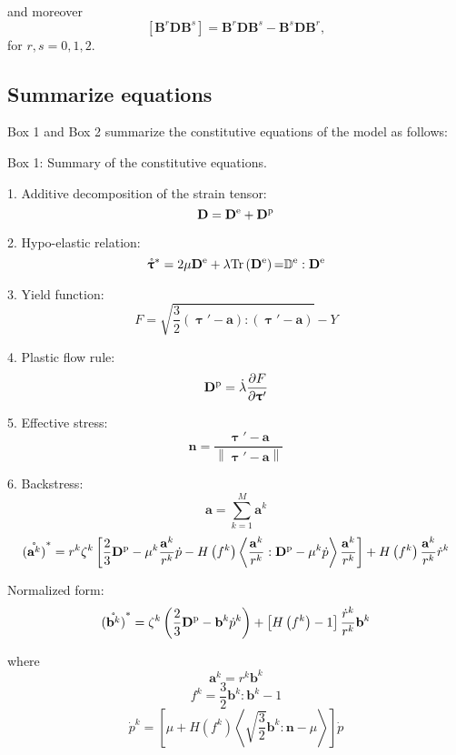 and moreover
\begin{equation}
\left[ {{{\mathbf{B}}^r}{\mathbf{D}}{{\mathbf{B}}^s}} \right] = {{\mathbf{B}}^r}{\mathbf{D}}{{\mathbf{B}}^s} - {{\mathbf{B}}^s}{\mathbf{D}}{{\mathbf{B}}^r},
\end{equation}
for $r,s = 0,1,2$.

\subsection{Summarize equations}
\noindent
Box 1 and Box 2 summarize the constitutive equations of the model as follows:
\begin{framed}
\label{Box:1}
Box 1: Summary of the constitutive equations.

1. Additive decomposition of the strain tensor:
\[{\mathbf{D}} = {{\mathbf{D}}^{\rm{e}}} + {{\mathbf{D}}^{\rm{p}}}\]

2. Hypo-elastic relation:
\[{\mathring {\bm{\uptau }}^{*}} = 2\mu {{\mathbf{D}}^{\rm{e}}} + \lambda {\rm{Tr}}\left( {{{\mathbf{D}}^{\rm{e}}}} \right){\rm{ = }}{\mathbb{D}^{\rm{e}}}:{{\mathbf{D}}^{\rm{e}}}\]

3. Yield function:
\[F = \sqrt {\frac{3}{2}\left( {{\bm{\uptau}}' - {\mathbf{a}}} \right):\left( {{\bm{\uptau}}' - {\mathbf{a}}} \right)}  - Y\]

4. Plastic flow rule:
\[{{{\mathbf{D}}^{\rm{p}}}} = \dot \lambda \frac{{\partial F}}{{\partial {\bm{\uptau }'}}}\]

5. Effective stress:
\[{\mathbf{n}} = \frac{{{\bm{\uptau}}' - {\mathbf{a}}}}{{\left\| {{\bm{\uptau}}' - {\mathbf{a}}} \right\|}}\]

6. Backstress:
\[{\mathbf{a}} = \sum\limits_{k = 1}^M {{{\mathbf{a}}^k}} \]
\[\mathring{\left({\mathbf{a}}^{k}\right)}^* = {r^k}{\zeta ^k}\left[ {\frac{2}{3}{{\mathbf{D}}^{\rm{p}}} - {\mu ^k}\frac{{{{\mathbf{a}}^k}}}{{{r^k}}}\dot p - H\left( {{f^k}} \right)\left\langle {\frac{{{{\mathbf{a}}^k}}}{{{r^k}}}:{{\mathbf{D}}^{\rm{p}}} - {\mu ^k}\dot p} \right\rangle \frac{{{{\mathbf{a}}^k}}}{{{r^k}}}} \right] + H\left( {{f^k}} \right)\frac{{{{\mathbf{a}}^k}}}{{{r^k}}}{\dot r^k}\]

Normalized form:
\[\mathring{\left({\mathbf{b}}^{k}\right)}^* = {\zeta ^k}\left( {\frac{2}{3}{{\mathbf{D}}^{\rm{p}}} - {{\mathbf{b}}^k}{{\dot p}^k}} \right) + \left[ {H\left( {{f^k}} \right) - 1} \right]\frac{{{{\dot r}^k}}}{{{r^k}}}{{\mathbf{b}}^k}\]

where
\[{{\mathbf{a}}^k} = {r^k}{{\mathbf{b}}^k}\]
\[{f^k} = \frac{3}{2}{{\mathbf{b}}^k}:{{\mathbf{b}}^k} - 1\]
\[{\dot p^k} = \left[ {\mu  + H\left( {{f^k}} \right)\left\langle {\sqrt {\frac{3}{2}} {{\mathbf{b}}^k}:{\mathbf{n}} - \mu } \right\rangle } \right]\dot p\]
\end{framed}


